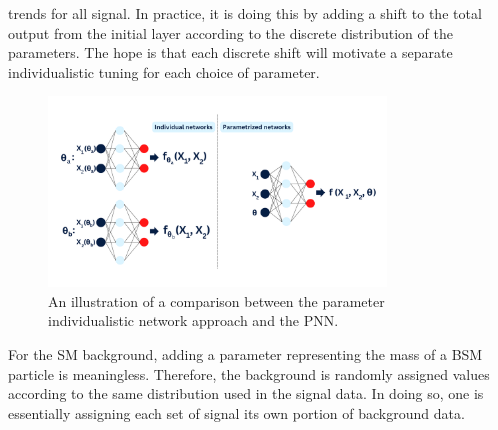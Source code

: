 trends for all signal. In practice, it is doing this by adding a shift to the total output from the initial layer according to 
the discrete distribution of the parameters. The hope is that each discrete shift will motivate a separate individualistic tuning
for each choice of parameter. 
\begin{figure}
    \centering
    \includegraphics[width=0.8\textwidth]{Figures/Illustrations/PNN.png}
    \caption{An illustration of a comparison between the parameter individualistic network 
    approach and the \ac{PNN}.}
    \label{fig:PNN}
\end{figure}
For the \ac{SM} background, adding a parameter representing the mass of a \ac{BSM} particle is meaningless. 
Therefore, the background is randomly assigned values according to the same distribution used in the signal data. 
In doing so, one is essentially assigning each set of signal its own portion of background data. 